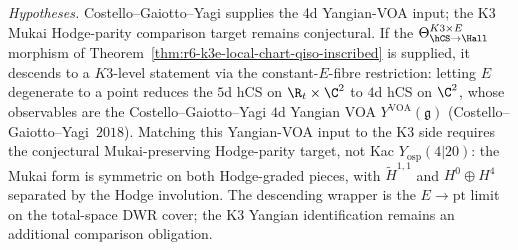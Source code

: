 \begin{remark}
\label{rem:r6-k3-from-k3e-inscribed}
\noindent\emph{Hypotheses.} Costello--Gaiotto--Yagi supplies the 4d
Yangian-VOA input; the K3 Mukai Hodge-parity comparison target remains
conjectural.
If the $\Theta^{K3\times E}_{\hCS\to\Hall}$ morphism of
Theorem~\ref{thm:r6-k3e-local-chart-qiso-inscribed} is supplied, it
descends to a
$K3$-level statement via the constant-$E$-fibre restriction: letting
$E$ degenerate to a point reduces the $5$d hCS on $\R_t\times\C^2$ to
$4$d hCS on $\C^2$, whose observables are the Costello--Gaiotto--Yagi
$4$d Yangian VOA
$Y^{\mathrm{VOA}}(\mathfrak{g})$
\textup{(}Costello--Gaiotto--Yagi~$2018$\textup{)}. Matching this
Yangian-VOA input to the K3 side requires the conjectural
Mukai-preserving Hodge-parity target, not Kac $Y_{\mathrm{osp}}(4|20)$:
the Mukai form is symmetric on both Hodge-graded pieces, with
$\widetilde H^{1,1}$ and $H^0\oplus H^4$ separated by the Hodge
involution. The descending wrapper is the $E\to\mathrm{pt}$ limit on
the total-space DWR cover; the K3 Yangian identification remains an
additional comparison obligation.
\end{remark}
